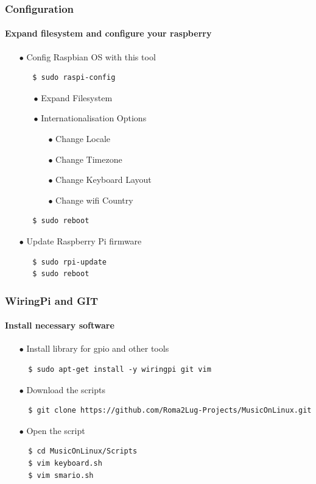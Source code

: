 \documentclass{beamer}
\begin{document}

\begin{frame}[fragile]
	\frametitle{\textbf{Configuration}}
	\framesubtitle{\textbf{Expand filesystem and configure your raspberry}}
		\begin{itemize}
			\item[$\bullet$] Config Raspbian OS with this tool
			\begin{lstlisting}
   $ sudo raspi-config
			\end{lstlisting}
			\begin{itemize}
				\item[$\bullet$] Expand Filesystem
				\item[$\bullet$] Internationalisation Options
				\begin{itemize}
					\item[$\bullet$] Change Locale
					\item[$\bullet$] Change Timezone
					\item[$\bullet$] Change Keyboard Layout
					\item[$\bullet$] Change wifi Country
				\end{itemize}
			\end{itemize}
			\begin{lstlisting}
   $ sudo reboot
			\end{lstlisting}
			\item[$\bullet$] Update Raspberry Pi firmware
			\begin{lstlisting}
   $ sudo rpi-update
   $ sudo reboot
			\end{lstlisting}
		\end{itemize}
\end{frame}


\begin{frame}[fragile]
	\frametitle{\textbf{WiringPi and GIT}}
	\framesubtitle{\textbf{Install necessary software}}
		\begin{itemize}
			\item[$\bullet$] Install library for gpio and other tools
			\begin{lstlisting}
  $ sudo apt-get install -y wiringpi git vim
			\end{lstlisting}
			\item[$\bullet$] Download the scripts
			\begin{lstlisting}
  $ git clone https://github.com/Roma2Lug-Projects/MusicOnLinux.git
			\end{lstlisting}
			\item[$\bullet$] Open the script
			\begin{lstlisting}
  $ cd MusicOnLinux/Scripts
  $ vim keyboard.sh
  $ vim smario.sh
			\end{lstlisting}
		\end{itemize}
\end{frame}
\end{document}
